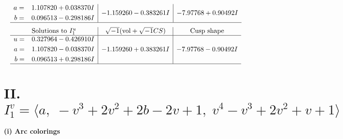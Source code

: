 \documentclass[1p]{elsarticle_modified}
\theoremstyle{definition}
\newcommand{\I}{\sqrt{-1}}
\begin{document}
$$\begin{array}{c|c|c}
\begin{aligned}
a &= \phantom{-}1.107820 + 0.038370 I \\
b &= \phantom{-}0.096513 - 0.298186 I\end{aligned}
 & -1.159260 - 0.383261 I & -7.97768 + 0.90492 I\\
 \hline 
 \end{array}$$\newpage$$\begin{array}{c|c|c}  
\text{Solutions to }I^u_{1}& \I (\text{vol} + \sqrt{-1}CS) & \text{Cusp shape}\\
 \hline 
\begin{aligned}
u &= \phantom{-}0.327964 - 0.426910 I \\
a &= \phantom{-}1.107820 - 0.038370 I \\
b &= \phantom{-}0.096513 + 0.298186 I\end{aligned}
 & -1.159260 + 0.383261 I & -7.97768 - 0.90492 I\\
 \hline 
 \end{array}$$\newpage\newpage\renewcommand{\arraystretch}{1}
\centering \section*{II. $I^v_{1}= \langle a,\;- v^3+2 v^2+2 b-2 v+1,\;v^4- v^3+2 v^2+v+1 \rangle$}
\flushleft \textbf{(i) Arc colorings}\\
\end{document}
